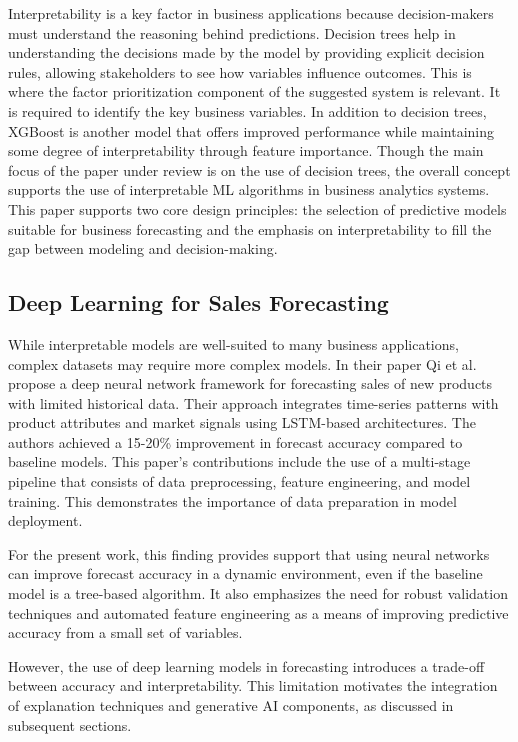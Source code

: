 \documentclass[12pt]{article}
\begin{document}
Interpretability is a key factor in business applications because decision-makers must understand the reasoning behind predictions. Decision trees help in understanding the decisions made by the model by providing explicit decision rules, allowing stakeholders to see how variables influence outcomes. This is where the factor prioritization component of the suggested system is relevant. It is required to identify the key business variables. In addition to decision trees, XGBoost is another model that offers improved performance while maintaining some degree of interpretability through feature importance. Though the main focus of the paper under review is on the use of decision trees, the overall concept supports the use of interpretable ML algorithms in business analytics systems. This paper supports two core design principles: the selection of predictive models suitable for business forecasting and the emphasis on interpretability to fill the gap between modeling and decision-making.

\subsection{Deep Learning for Sales Forecasting}
While interpretable models are well-suited to many business applications, complex datasets may require more complex models. In their paper Qi et al.~\cite{Qi2019ADN} propose a deep neural network framework for forecasting sales of new products with limited historical data. Their approach integrates time-series patterns with product attributes and market signals using LSTM-based architectures. The authors achieved a 15-20\% improvement in forecast accuracy compared to baseline models. This paper's contributions include the use of a multi-stage pipeline that consists of data preprocessing, feature engineering, and model training. This demonstrates the importance of data preparation in model deployment. 

For the present work, this finding provides support that using neural networks can improve forecast accuracy in a dynamic environment, even if the baseline model is a tree-based algorithm. It also emphasizes the need for robust validation techniques and automated feature engineering as a means of improving predictive accuracy from a small set of variables.

However, the use of deep learning models in forecasting introduces a trade-off between accuracy and interpretability. This limitation motivates the integration of explanation techniques and generative AI components, as discussed in subsequent sections.
\end{document}
